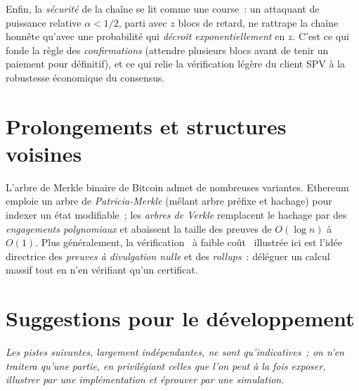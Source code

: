 \documentclass[11pt,a4paper]{article}
\theoremstyle{definition}\newtheorem{definition}{Définition}
\theoremstyle{plain}\newtheorem{theoreme}{Théorème}\newtheorem{proposition}{Proposition}
\theoremstyle{remark}\newtheorem{remarque}{Remarque}
\begin{document}
Enfin, la \emph{sécurité} de la chaîne se lit comme une course~: un attaquant de puissance
relative $\alpha<1/2$, parti avec $z$ blocs de retard, ne rattrape la chaîne honnête qu'avec une
probabilité qui \emph{décroît exponentiellement} en $z$. C'est ce qui fonde la règle des
\emph{confirmations} (attendre plusieurs blocs avant de tenir un paiement pour définitif), et ce
qui relie la vérification légère du client SPV à la robustesse économique du consensus.

\section{Prolongements et structures voisines}

L'arbre de Merkle binaire de Bitcoin admet de nombreuses variantes. Ethereum emploie un arbre de
\emph{Patricia-Merkle} (mêlant arbre préfixe et hachage) pour indexer un état modifiable~; les
\emph{arbres de Verkle} remplacent le hachage par des \emph{engagements polynomiaux} et abaissent
la taille des preuves de $O(\log n)$ à $O(1)$. Plus généralement, la vérification \guillemotleft~à
faible coût~\guillemotright{} illustrée ici est l'idée directrice des \emph{preuves à divulgation
nulle} et des \emph{rollups}~: déléguer un calcul massif tout en n'en vérifiant qu'un certificat.

\section*{Suggestions pour le développement}

\emph{Les pistes suivantes, largement indépendantes, ne sont qu'indicatives~; on n'en traitera
qu'une partie, en privilégiant celles que l'on peut à la fois exposer, illustrer par une
implémentation et éprouver par une simulation.}
\end{document}
